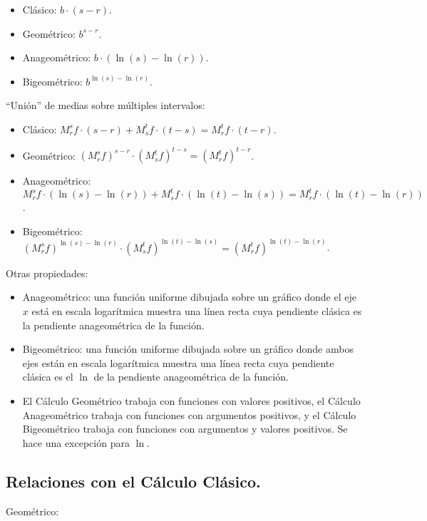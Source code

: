 \begin{itemize}
	\item Clásico: $b \cdot (s - r)$.
	\item Geométrico: $b^{s-r}$.
	\item Anageométrico: $b \cdot (\ln(s) - \ln(r))$.
	\item Bigeométrico: $b^{\ln(s) - \ln(r)}$.
\end{itemize}

\enquote{Unión} de medias sobre múltiples intervalos:

\begin{itemize}
	\item Clásico: $M_r^s f \cdot (s - r) + M_s^t f \cdot (t - s) = M_r^t f \cdot (t - r)$.
	\item Geométrico: $(M_r^s f)^{s - r} \cdot (M_s^t f)^{t - s} = (M_r^t f)^{t - r}$.
	\item Anageométrico: $M_r^s f \cdot (\ln(s) - \ln(r)) + M_s^t f \cdot (\ln(t) - \ln(s)) = M_r^t f \cdot (\ln(t) - \ln(r))$.
	\item Bigeométrico: $(M_r^s f)^{\ln(s) - \ln(r)} \cdot (M_s^t f)^{\ln(t) - \ln(s)} = (M_r^t f)^{\ln(t) - \ln(r)}$.
\end{itemize}

Otras propiedades:

\begin{itemize}
	\item Anageométrico: una función uniforme dibujada sobre un gráfico donde el eje $x$ está en escala logarítmica muestra una línea recta cuya pendiente clásica es la pendiente anageométrica de la función.
	\item Bigeométrico: una función uniforme dibujada sobre un gráfico donde ambos ejes están en escala logarítmica muestra una línea recta cuya pendiente clásica es el $\ln$ de la pendiente anageométrica de la función.
	\item El Cálculo Geométrico trabaja con funciones con valores positivos, el Cálculo Anageométrico trabaja con funciones con argumentos positivos, y el Cálculo Bigeométrico trabaja con funciones con argumentos y valores positivos. Se hace una excepción para $\ln$.
\end{itemize}

\subsection{Relaciones con el Cálculo Clásico.}

Geométrico:

